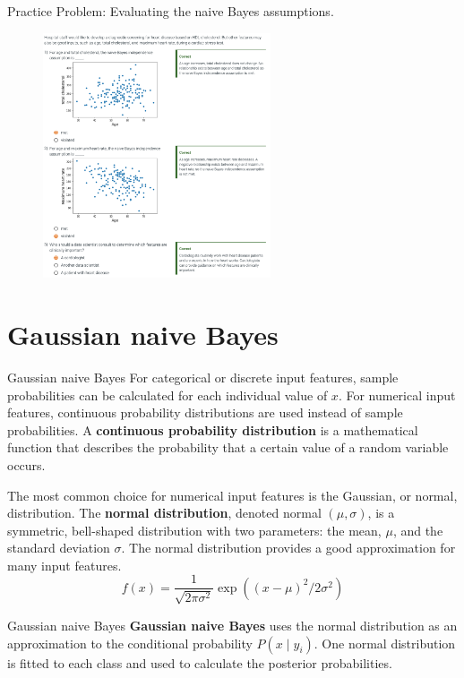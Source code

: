 \documentclass[10pt,dvipsnames]{beamer}
\begin{document}
\begin{frame}{Practice Problem: Evaluating the naive Bayes assumptions.}
	\begin{figure}[ht]
		\centering
		\includegraphics[width=0.6\textwidth]{imgs/nb_19.png}
	\end{figure}
\end{frame}

\section{Gaussian naive Bayes}
\begin{frame}{Gaussian naive Bayes}
	For categorical or discrete input features, sample probabilities can be calculated for each individual value of \(x\). For numerical input features,
	continuous probability distributions are used instead of sample probabilities. A \textbf{continuous probability distribution} is a mathematical
	function that describes the probability that a certain value of a random variable occurs.
	
	The most common choice for numerical input features is the Gaussian, or normal, distribution. The \textbf{normal distribution}, denoted
	normal \((\mu, \sigma)\), is a symmetric, bell-shaped distribution with two parameters: the mean, \(\mu\), and the standard deviation \(\sigma\). The normal
	distribution provides a good approximation for many input features.
	$$
	f(x)=\frac{1}{\sqrt{2 \pi \sigma^{2}}} \exp \left((x-\mu)^{2} / 2 \sigma^{2}\right)
	$$
\end{frame}

\begin{frame}{Gaussian naive Bayes}
\textbf{Gaussian naive Bayes} uses the normal distribution as an approximation to the conditional probability \(P\left(x \mid y_{i}\right)\). One normal distribution is fitted to each class and used to calculate the posterior probabilities.
\end{frame}
\end{document}
